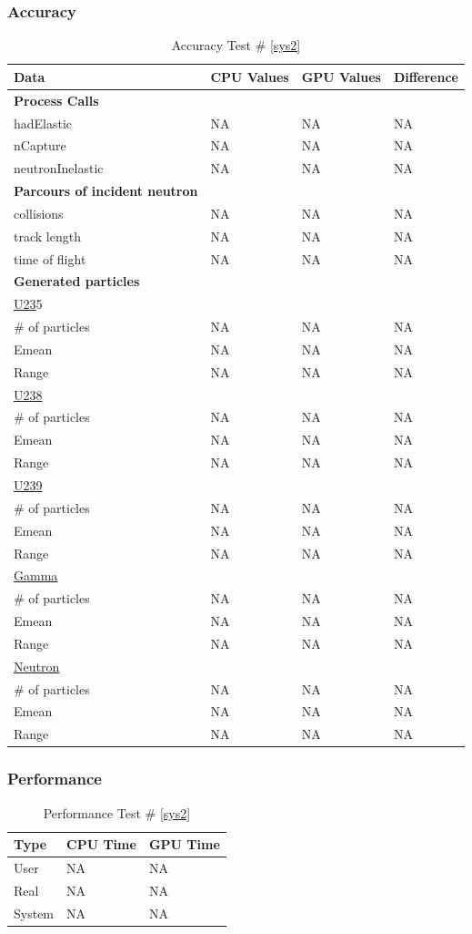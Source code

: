 \documentclass[12pt]{article}
\begin{document}
	\subsubsection{Accuracy}
		\begin{table}[!htbp]
		\centering
		\caption{Accuracy Test \# \ref{sys2}}\label{_acc}
		\begin{tabular}{llll}
		\toprule
		\bf Data & CPU Values & GPU Values & Difference\\\midrule
		\bf Process Calls&&&\\
		hadElastic&NA&NA&NA\\
		nCapture&NA&NA&NA\\
		neutronInelastic&NA&NA&NA\\ 
		\bf Parcours of incident neutron&&&\\
		collisions&NA&NA&NA\\
		track length&NA&NA&NA\\
		time of flight&NA&NA&NA\\
		\bf Generated particles&&&\\
		\underline{U23}5&&&\\
		\# of particles&NA&NA&NA\\
		Emean&NA&NA&NA\\
		Range&NA&NA&NA\\
		\underline{U238}&&&\\
		\# of particles&NA&NA&NA\\
		Emean&NA&NA&NA\\
		Range&NA&NA&NA\\
		\underline{U239}&&&\\
		\# of particles&NA&NA&NA\\
		Emean&NA&NA&NA\\
		Range&NA&NA&NA\\
		\underline{Gamma}&&&\\
		\# of particles&NA&NA&NA\\
		Emean&NA&NA&NA\\
		Range&NA&NA&NA\\
		\underline{Neutron}&&&\\
		\# of particles&NA&NA&NA\\
		Emean&NA&NA&NA\\
		Range&NA&NA&NA\\
		\end{tabular}
		\end{table}
		\break
	\subsubsection{Performance}
		\begin{table}[!htbp]
		\centering
		\caption{Performance Test \# \ref{sys2}}\label{_acc}
		\begin{tabular}{lll}
		\toprule
		Type&CPU Time& GPU Time\\\midrule
		User&NA&NA\\
		Real&NA&NA\\
		System&NA&NA\\
		\end{tabular}
		\end{table}
\end{document}
